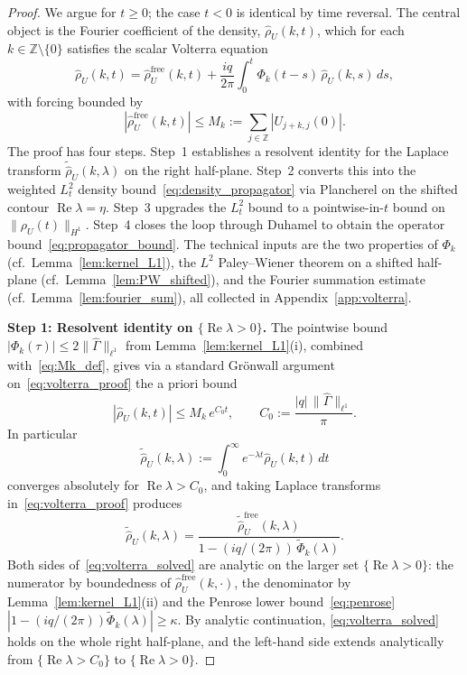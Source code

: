\documentclass[11pt]{amsart}
\theoremstyle{definition}
\newcommand{\Z}{\mathbb{Z}}
\begin{document}
\begin{proof}
We argue for $t\ge 0$; the case $t<0$ is identical by time reversal. The central object is the Fourier coefficient of the density, $\hat\rho_U(k,t)$, which for each $k\in\Z\setminus\{0\}$ satisfies the scalar Volterra equation
\begin{equation}\label{eq:volterra_proof}
  \hat\rho_U(k,t)
  = \hat\rho_U^{\mathrm{free}}(k,t)
  + \frac{iq}{2\pi}\int_0^t\Phi_k(t{-}s)\,
  \hat\rho_U(k,s)\,ds,
\end{equation}
with forcing bounded by
\begin{equation}\label{eq:Mk_def}
  |\hat\rho_U^{\mathrm{free}}(k,t)|
  \le M_k
  :=\sum_{j\in\Z}|U_{j+k,j}(0)|.
\end{equation}
The proof has four steps. Step~1 establishes a resolvent identity for the Laplace transform $\tilde{\hat\rho}_U(k,\lambda)$ on the right half-plane. Step~2 converts this into the weighted $L^2_t$ density bound~\eqref{eq:density_propagator} via Plancherel on the shifted contour $\operatorname{Re}\lambda=\eta$. Step~3 upgrades the $L^2_t$ bound to a pointwise-in-$t$ bound on $\|\rho_U(t)\|_{H^1}$. Step~4 closes the loop through Duhamel to obtain the operator bound~\eqref{eq:propagator_bound}. The technical inputs are the two properties of $\Phi_k$ (cf.\ Lemma~\ref{lem:kernel_L1}), the $L^2$ Paley--Wiener theorem on a shifted half-plane (cf.\ Lemma~\ref{lem:PW_shifted}), and the Fourier summation estimate (cf.\ Lemma~\ref{lem:fourier_sum}), all collected in Appendix~\ref{app:volterra}.

\medskip

\noindent\textbf{Step 1: Resolvent identity on $\{\operatorname{Re}\lambda>0\}$.} The pointwise bound $|\Phi_k(\tau)|\le 2\|\hat\Gamma\|_{\ell^1}$ from Lemma~\ref{lem:kernel_L1}(i), combined with~\eqref{eq:Mk_def}, gives via a standard Gr\"onwall argument on~\eqref{eq:volterra_proof} the a priori bound
\begin{equation}\label{eq:apriori_gronwall}
  |\hat\rho_U(k,t)|\le M_k\,e^{C_0 t},
  \qquad
  C_0:=\frac{|q|\,\|\hat\Gamma\|_{\ell^1}}{\pi}.
\end{equation}
In particular
\[
  \tilde{\hat\rho}_U(k,\lambda)
  :=\int_0^\infty e^{-\lambda t}
  \hat\rho_U(k,t)\,dt
\]
converges absolutely for $\operatorname{Re}\lambda>C_0$, and taking Laplace transforms in~\eqref{eq:volterra_proof} produces
\begin{equation}\label{eq:volterra_solved}
  \tilde{\hat\rho}_U(k,\lambda)
  = \frac{\tilde{\hat\rho}_U^{\mathrm{free}}
  (k,\lambda)}
  {1-(iq/(2\pi))\,\tilde\Phi_k(\lambda)}.
\end{equation}
Both sides of~\eqref{eq:volterra_solved} are analytic on the larger set $\{\operatorname{Re}\lambda>0\}$: the numerator by boundedness of $\hat\rho_U^{\mathrm{free}}(k,\cdot)$, the denominator by Lemma~\ref{lem:kernel_L1}(ii) and the Penrose lower bound~\eqref{eq:penrose} $|1-(iq/(2\pi))\tilde\Phi_k(\lambda)|\ge\kappa$. By analytic continuation, \eqref{eq:volterra_solved} holds on the whole right half-plane, and the left-hand side extends analytically from $\{\operatorname{Re}\lambda>C_0\}$ to $\{\operatorname{Re}\lambda>0\}$.


\end{proof}
\end{document}
